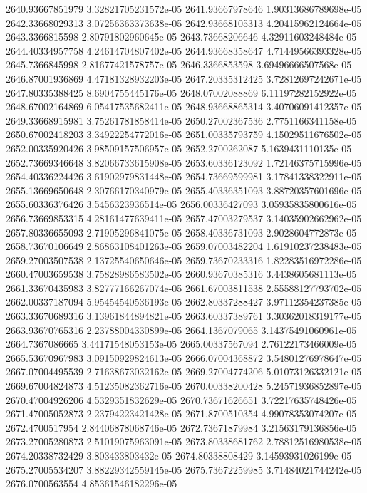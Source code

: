 {2640.93667851979 3.32821705231572e-05
2641.93667978646 1.90313686789698e-05
2642.33668029313 3.07256363373638e-05
2642.93668105313 4.20415962124664e-05
2643.3366815598 2.80791802960645e-05
2643.73668206646 4.32911603248484e-05
2644.40334957758 4.24614704807402e-05
2644.93668358647 4.71449566393328e-05
2645.7366845998 2.81677421578757e-05
2646.3366853598 3.69496666507568e-05
2646.87001936869 4.47181328932203e-05
2647.20335312425 3.72812697242671e-05
2647.80335388425 8.6904755445176e-05
2648.07002088869 6.11197282152922e-05
2648.67002164869 6.05417535682411e-05
2648.93668865314 3.40706091412357e-05
2649.33668915981 3.75261781858414e-05
2650.27002367536 2.7751166341158e-05
2650.67002418203 3.34922254772016e-05
2651.00335793759 4.15029511676502e-05
2652.00335920426 3.98509157506957e-05
2652.2700262087 5.1639431110135e-05
2652.73669346648 3.82066733615908e-05
2653.60336123092 1.72146375715996e-05
2654.40336224426 3.61902979831448e-05
2654.73669599981 3.17841338322911e-05
2655.13669650648 2.30766170340979e-05
2655.40336351093 3.88720357601696e-05
2655.60336376426 3.5456323936514e-05
2656.00336427093 3.05935835800616e-05
2656.73669853315 4.28161477639411e-05
2657.47003279537 3.14035902662962e-05
2657.80336655093 2.71905296841075e-05
2658.40336731093 2.9028604772873e-05
2658.73670106649 2.86863108401263e-05
2659.07003482204 1.61910237238483e-05
2659.27003507538 2.13725540650646e-05
2659.73670233316 1.82283516972286e-05
2660.47003659538 3.75828986583502e-05
2660.93670385316 3.4438605681113e-05
2661.33670435983 3.82777166267074e-05
2661.67003811538 2.55588127793702e-05
2662.00337187094 5.95454540536193e-05
2662.80337288427 3.97112354237385e-05
2663.33670689316 3.13961844894821e-05
2663.60337389761 3.30362018319177e-05
2663.93670765316 2.23788004330899e-05
2664.1367079065 3.14375491060961e-05
2664.7367086665 3.44171548053153e-05
2665.00337567094 2.76122173466009e-05
2665.53670967983 3.09150929824613e-05
2666.07004368872 3.54801276978647e-05
2667.07004495539 2.71638673032162e-05
2669.27004774206 5.01073126332121e-05
2669.67004824873 4.51235082362716e-05
2670.00338200428 5.24571936852897e-05
2670.47004926206 4.5329351832629e-05
2670.73671626651 3.72217635748426e-05
2671.47005052873 2.23794223421428e-05
2671.8700510354 4.99078353074207e-05
2672.4700517954 2.84406878068746e-05
2672.73671879984 3.21563179136856e-05
2673.27005280873 2.51019075963091e-05
2673.80338681762 2.78812516980538e-05
2674.20338732429 3.803433803432e-05
2674.80338808429 3.14593931026199e-05
2675.27005534207 3.88229342559145e-05
2675.73672259985 3.71484021744242e-05
2676.0700563554 4.85361546182296e-05
}
